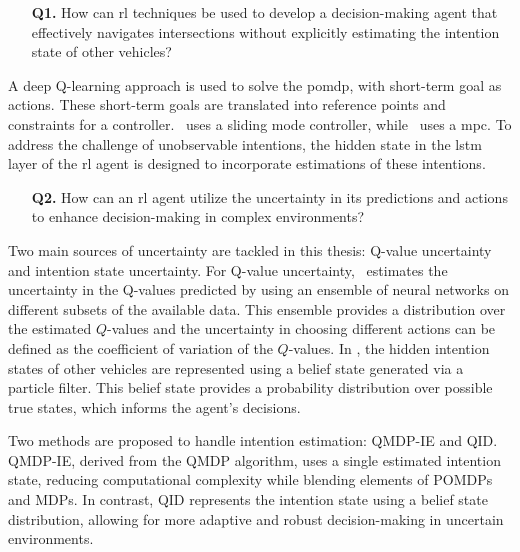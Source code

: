 \begin{enumerate}
	\item[\textbf{Q1.}] How can \gls{rl} techniques be used to develop a decision-making agent that effectively navigates intersections without explicitly estimating the intention state of other vehicles?
\end{enumerate}
A deep Q-learning approach is used to solve the \gls{pomdp}, with short-term goal as actions. These short-term goals are translated into reference points and constraints for a controller. \paperLSTM \ uses a sliding mode controller, while \paperMPC \ uses a \gls{mpc}.
To address the challenge of unobservable intentions, the hidden state in the \gls{lstm} layer of the \gls{rl} agent is designed to incorporate estimations of these intentions.

\begin{enumerate}
	\item[\textbf{Q2.}] How can an \gls{rl} agent utilize the uncertainty in its predictions and actions to enhance decision-making in complex environments? 
\end{enumerate}
Two main sources of uncertainty are tackled in this thesis: Q-value uncertainty and intention state uncertainty.
For Q-value uncertainty, \paperEnsamble \ estimates the uncertainty in the Q-values predicted by using an ensemble of neural networks on different subsets of the available data. This ensemble provides a distribution over the estimated $Q$-values and the uncertainty in choosing different actions can be defined as the coefficient of variation of the $Q$-values.
In \paperBelief, the hidden intention states of other vehicles are represented using a belief state generated via a particle filter. This belief state provides a probability distribution over possible true states, which informs the agent's decisions.

Two methods are proposed to handle intention estimation: QMDP-IE and QID. QMDP-IE, derived from the QMDP algorithm, uses a single estimated intention state, reducing computational complexity while blending elements of POMDPs and MDPs. In contrast, QID represents the intention state using a belief state distribution, allowing for more adaptive and robust decision-making in uncertain environments.

